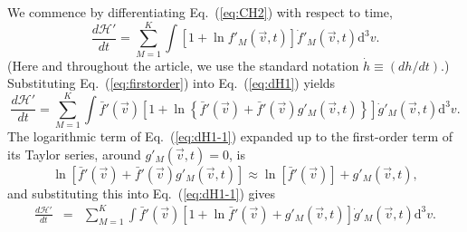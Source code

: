 We commence by differentiating Eq.~(\ref{eq:CH2}) with respect to time,
%
\begin{equation}\label{eq:dH1}
    \frac{d\mathcal{H}'}{dt}=\sum_{M=1}^{K}\int\left[
      1+\ln f'_M(\vec{v},t)
    \right]\dot f'_M(\vec{v},t)\mathrm{d}^3v.
\end{equation}
%
(Here and throughout the article, we use the standard notation $\dot h\equiv(dh/dt)$.)
Substituting Eq.~(\ref{eq:firstorder}) into Eq.~(\ref{eq:dH1}) yields
%
\begin{equation}\label{eq:dH1-1}
    \frac{d\mathcal{H}'}{dt}=\sum_{M=1}^{K}\int\bar f'(\vec{v}) \left[
      1+\ln \left\{
        \bar f'(\vec{v})+\bar f'(\vec{v})g'_M(\vec{v},t)
      \right\}
    \right]\dot g'_M(\vec{v},t)\mathrm{d}^3v.
\end{equation}
%
The logarithmic term of Eq.~(\ref{eq:dH1-1}) expanded up to the first-order term
of its Taylor series, around $g'_{M}(\vec{v},t)=0$, is
%
\begin{equation}\label{lnapproximationclassical}
    \ln [\bar{f}'(\vec{v})+\bar{f}'(\vec{v}) g'_{M}(\vec{v},t)] \approx
    \ln [\bar{f}'(\vec{v})]+ g'_{M}(\vec{v},t),
\end{equation}
%
and substituting this into Eq.~(\ref{eq:dH1-1}) gives
%
\begin{eqnarray}
    \frac{d\mathcal{H}'}{dt}&=&\sum_{M=1}^{K} \int \bar f'(\vec{v})\left[
      1+\ln \bar f'(\vec{v})+g'_M(\vec{v},t)
    \right]\dot g'_M(\vec{v},t)\mathrm{d}^3v.
\end{eqnarray}
%

